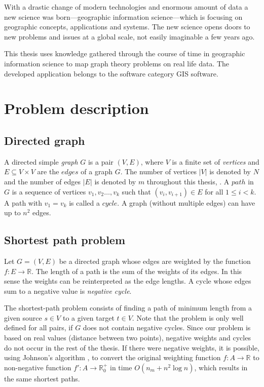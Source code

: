 \documentclass[thesis=M,english]{FITthesis}[2012/10/20]
\begin{document}
With a drastic change of modern technologies and enormous amount of data a new science was born---geographic information science---which is focusing on geographic concepts, applications and systems. The new science opens doors to new problems and issues at a global scale, not easily imaginable a few years ago. 

This thesis uses knowledge gathered through the course of time in geographic information science to map graph theory problems on real life data. The developed application belongs to the software category GIS software. 


\section{Problem description}

\subsection{Directed graph}
A directed simple \textit{graph} $G$ is a pair $(V, E)$, where $V$ is a finite set of \textit{vertices} and $E \subseteq V \times V$ are the $edges$ of a graph $G$. The number of vertices $|V|$ is denoted by $N$ and the number of edges $|E|$ is denoted by $m$ throughout this thesis, . A $path$ in $G$ is a sequence of vertices $v_1, v_2 \dots ,v_k$ such that $(v_i,v_{i+1}) \in E$ for all $1 \leq i < k$. A path with $v_1 = v_k$ is called a $cycle$. A graph (without multiple edges) can have up to $n^2$ edges. 


\subsection{Shortest path problem}
\label{sec:SPP}
Let $G = (V, E)$ be a directed graph whose edges are weighted by the function $f: E \to \mathbb{R}$. 
The length of a path is the sum of the weights of its edges. In this sense the weights can be reinterpreted as the edge lengths. A cycle whose edges sum to a negative value is \textit{negative cycle}.  

The shortest-path problem consists of finding a path of minimum length from a given source $s \in V$ to a given target $t \in V$.
Note that the problem is only well defined for all pairs, if $G$ does not contain negative cycles.
Since our problem is based on real values (distance between two points), negative weights and cycles do not occur in the rest of the thesis.
If there were negative weights, it is possible, using Johnson's algorithm \cite{Johnson77}, to convert the original weighting function $f: A \to \mathbb{R}$ to non-negative function $ f': A \to \mathbb{R}^+_0$ in time $O(n_m + n^2 \log n)$, which results in the same shortest paths.
\end{document}
